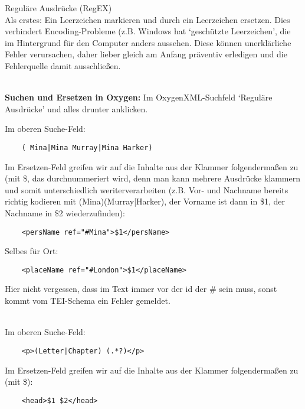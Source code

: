 





\begin{frame}{Reguläre Ausdrücke (RegEX)}
\footnotesize
{}\\
Als erstes: Ein Leerzeichen markieren und durch ein Leerzeichen ersetzen. Dies verhindert Encoding-Probleme (z.B. Windows hat `geschützte Leerzeichen', die im Hintergrund für den Computer anders aussehen. Diese können unerklärliche Fehler verursachen, daher lieber gleich am Anfang präventiv erledigen und die Fehlerquelle damit ausschließen.
\medskip


\\
\textbf{Suchen und Ersetzen in Oxygen:} Im OxygenXML-Suchfeld `Reguläre Ausdrücke' und alles drunter anklicken.

Im oberen Suche-Feld:
\begin{verbatim}
    ( Mina|Mina Murray|Mina Harker)
\end{verbatim}

Im Ersetzen-Feld greifen wir auf die Inhalte aus der Klammer folgendermaßen zu (mit \$, das durchnummeriert wird, denn man kann mehrere Ausdrücke klammern und somit unterschiedlich weriterverarbeiten (z.B. Vor- und Nachname bereits richtig kodieren mit (Mina)(Murray|Harker), der Vorname ist dann in \$1, der Nachname in \$2 wiederzufinden):
\begin{verbatim}
    <persName ref="#Mina">$1</persName>
\end{verbatim}

Selbes für Ort:
\begin{verbatim}
    <placeName ref="#London">$1</placeName>
\end{verbatim}

Hier nicht vergessen, dass im Text immer vor der id der \# sein muss, sonst kommt vom TEI-Schema ein Fehler gemeldet.

\medskip

\\
Im oberen Suche-Feld:
\begin{verbatim}
    <p>(Letter|Chapter) (.*?)</p>
\end{verbatim}

Im Ersetzen-Feld greifen wir auf die Inhalte aus der Klammer folgendermaßen zu (mit \$):
\begin{verbatim}
    <head>$1 $2</head>
\end{verbatim}


\end{frame}
